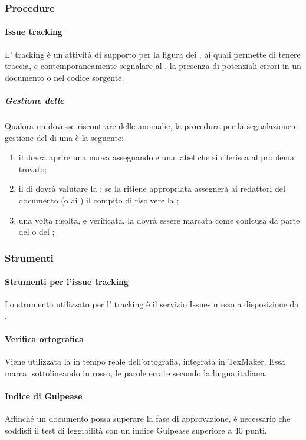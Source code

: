 \subsubsection{Procedure}
\paragraph{Issue tracking}
L' tracking è un'attività di supporto per la figura dei \VERP, ai quali permette di tenere traccia, e contemporaneamente segnalare al \RESP, la presenza di potenziali errori in un documento o nel codice sorgente.
 \subparagraph{Gestione delle }
Qualora un \VER{} dovesse riscontrare delle anomalie, la procedura per la segnalazione e gestione del  di una  è la seguente:
\begin{enumerate}
	\item il \VER{} dovrà aprire una nuova  assegnandole una label che si riferisca al problema trovato;
	\item il \RESP{} di  dovrà valutare la ; se la ritiene appropriata assegnerà ai redattori del documento (o ai \PRP) il compito di risolvere la ;
	\item una volta risolta, e verificata, la  dovrà essere marcata come conlcusa da parte del \RESP{} o del \VER;
\end{enumerate}
\subsubsection{Strumenti}
\paragraph{Strumenti per l'issue tracking}
Lo strumento utilizzato per l' tracking è il servizio Issues messo a disposizione da .
\paragraph{Verifica ortografica}
Viene utilizzata la  in tempo reale dell'ortografia, integrata in TexMaker. Essa marca,
sottolineando in rosso, le parole errate secondo la lingua italiana.
\paragraph{Indice di Gulpease}
Affinché un documento possa superare la fase di approvazione, è necessario che soddisfi il test di leggibilità con un indice Gulpease superiore a 40 punti.
